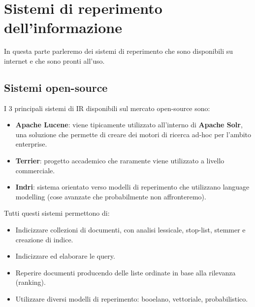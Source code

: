 

\chapter{Sistemi di reperimento dell'informazione}

In questa parte parleremo dei sistemi di reperimento che sono disponibili su internet e che sono pronti all'uso.

\section{Sistemi open-source}

I 3 principali sistemi di IR disponibili sul mercato open-source sono:

\begin{itemize}
	\item \textbf{Apache Lucene}: viene tipicamente utilizzato all'interno di \textbf{Apache Solr}, una soluzione che permette di creare dei motori di ricerca ad-hoc per l'ambito enterprise.
	\item \textbf{Terrier}: progetto accademico che raramente viene utilizzato a livello commerciale.
	\item \textbf{Indri}: sistema orientato verso modelli di reperimento che utilizzano language modelling (cose avanzate che probabilmente non affronteremo).
\end{itemize}

\noindent Tutti questi sistemi permettono di:

\begin{itemize}
	\item Indicizzare collezioni di documenti, con analisi lessicale, stop-list, stemmer e creazione di indice.
	\item Indicizzare ed elaborare le query.
	\item Reperire documenti producendo delle liste ordinate in base alla rilevanza (ranking).
	\item Utilizzare diversi modelli di reperimento: booelano, vettoriale, probabilistico.
\end{itemize}

